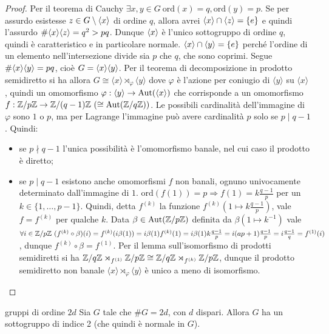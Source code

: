 \begin{proof}
    Per il teorema di Cauchy $\exists x,y \in G \ \text{ord}(x) = q, \text{ord}(y) = p$. Se per assurdo esistesse $z \in G \setminus \langle x \rangle$ di ordine $q$, allora avrei $\langle x \rangle \cap \langle z \rangle = \{e\}$ e quindi l'assurdo $\# \langle x \rangle\langle z \rangle = q^2 > pq$. Dunque $\langle x \rangle$ è l'unico sottogruppo di ordine $q$, quindi è caratteristico e in particolare normale.
    $\langle x \rangle \cap \langle y \rangle = \{e\}$ perché l'ordine di un elemento nell'intersezione divide sia $p$ che $q$, che sono coprimi. Segue $\#\langle x \rangle\langle y \rangle = pq$, cioè $G = \langle x \rangle\langle y \rangle$. Per il teorema di decomposizione in prodotto semidiretto si ha allora $G \cong \langle x \rangle \rtimes_{\varphi} \langle y \rangle$ dove $\varphi$ è l'azione per coniugio di $\langle y \rangle$ su $\langle x \rangle$,
    quindi un omomorfismo $\varphi : \langle y \rangle \rightarrow \text{Aut}(\langle x \rangle)$ che corrisponde a un omomorfismo $f : \mathbb{Z}/p\mathbb{Z} \to \mathbb{Z}/(q-1)\mathbb{Z} \ (\cong \text{Aut}(\mathbb{Z}/q\mathbb{Z}))$.
    Le possibili cardinalità dell'immagine di $\varphi$ sono $1$ o $p$, ma per Lagrange l'immagine può avere cardinalità $p$ solo se $p \mid q-1$. Quindi:
    \begin{itemize}
        \item se $p \nmid q-1$ l'unica possibilità è l'omomorfismo banale, nel cui caso il prodotto è diretto;
        \item se $p \mid q-1$ esistono anche omomorfismi $f$ non banali, ognuno univocamente determinato dall'immagine di $1$. $\text{ord}(f(1)) = p \Rightarrow f(1) = k \frac{q-1}{p}$ per un $k \in \{1, \dots, p-1\}$. Quindi, detta $f^{(k)}$ la funzione $f^{(k)}(1 \mapsto k \frac{q-1}{p})$, vale $f = f^{(k)}$ per qualche $k$. Data $\beta \in \text{Aut}(\mathbb{Z}/p\mathbb{Z})$ definita da $\beta(1 \mapsto k^{-1})$ vale $\forall i \in \mathbb{Z}/p\mathbb{Z} \ (f^{(k)} \circ \beta)(i) = f^{(k)}(i \beta(1)) = i\beta(1)f^{(k)}(1) = i\beta(1)k\frac{q-1}{p} = i (ap + 1) \frac{q-1}{p} = i \frac{q-1}{q} = f^{(1)}(i)$, dunque $f^{(k)} \circ \beta = f^{(1)}$. Per il lemma sull'isomorfismo di prodotti semidiretti si ha $\mathbb{Z}/q\mathbb{Z} \rtimes_{f^{(1)}} \mathbb{Z}/p\mathbb{Z} \cong \mathbb{Z}/q\mathbb{Z} \rtimes_{f^{(k)}} \mathbb{Z}/p\mathbb{Z}$, dunque il prodotto semidiretto non banale $\langle x \rangle \rtimes_\varphi \langle y \rangle$ è unico a meno di isomorfismo.
    \end{itemize}
\end{proof}
\begin{proposition}{gruppi di ordine $2d$}
    Sia $G$ tale che $\#G = 2d$, con $d$ dispari. Allora $G$ ha un sottogruppo di indice 2 (che quindi è normale in $G$).
\end{proposition}
